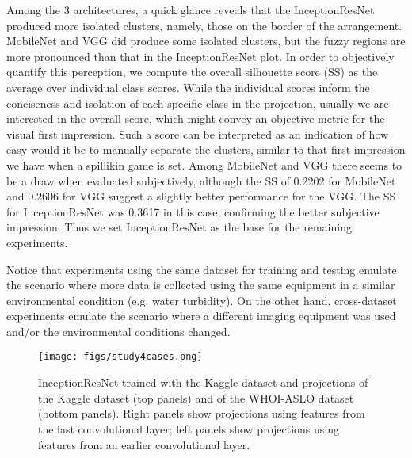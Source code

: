 \documentclass[sn-basic]{sn-jnl}%
\theoremstyle{thmstyleone}%
\theoremstyle{thmstyletwo}%
\theoremstyle{thmstylethree}%
\begin{document}
Among the 3 architectures, a quick glance reveals that the InceptionResNet produced more isolated clusters, namely, those on the border of the arrangement. MobileNet and VGG did produce some isolated clusters, but the fuzzy regions are more pronounced than that in the InceptionResNet plot. In order to objectively quantify this perception, we compute the overall silhouette score (SS) as the average over individual class scores. While the individual scores inform the conciseness and isolation of each specific class in the projection, usually we are interested in the overall score, which might convey an objective metric for the visual first impression. Such a score can be interpreted as an indication of how easy would it be to manually separate the clusters, similar to that first impression we have when a spillikin game is set. Among MobileNet and VGG there seems to be a draw when evaluated subjectively, although the SS of 0.2202 for MobileNet and 0.2606 for VGG suggest a slightly better performance for the VGG. The SS for InceptionResNet was 0.3617 in this case, confirming the better subjective impression. Thus we set InceptionResNet as the base for the remaining experiments.

Notice that experiments using the same dataset for training and testing emulate the scenario where more data is collected using the same equipment in a similar environmental condition (e.g. water turbidity). On the other hand, cross-dataset experiments emulate the scenario where a different imaging equipment was used and/or the environmental conditions changed.

\begin{figure*}[htb]
\centerline{\texttt{[image: figs/study4cases.png]}}
\caption{InceptionResNet trained with the Kaggle dataset and projections of the Kaggle dataset (top panels) and of the WHOI-ASLO dataset (bottom panels). Right panels show projections using features from the last convolutional layer; left panels show projections using features from an earlier convolutional layer.}
\label{fig:study4cases}
\end{figure*}
\end{document}
